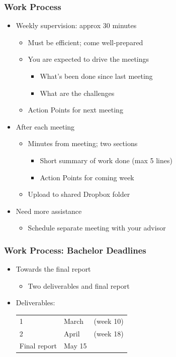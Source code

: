 \documentclass[hyperref={pdfpagelabels=false}, aspectratio=1610,handout]{beamer}
\begin{document}
\begin{frame}
\frametitle{Work Process}
\begin{block}{}
 \begin{itemize}
  \item Weekly supervision: approx 30 minutes
  \begin{itemize}
  	\item Must be efficient; come well-prepared
  	\item You are expected to drive the meetings
	\begin{itemize}
		\item What's been done since last meeting
		\item What are the challenges
	\end{itemize}
  	\item Action Points for next meeting
  \end{itemize}
  \item<2-> After each meeting
  \begin{itemize}
  	\item<2-> Minutes from meeting;  two sections
	\begin{itemize}
		\item<2-> Short summary of work done (max 5 lines)
		\item<2-> Action Points for coming week
	\end{itemize}
	\item<2-> Upload to shared Dropbox folder
  \end{itemize}
 \item<3-> Need more assistance
 \begin{itemize}
 	\item<3-> Schedule separate meeting with your advisor
 \end{itemize}
 \end{itemize}
\end{block}
\end{frame}

\begin{frame}
\frametitle{Work Process: Bachelor Deadlines}
\begin{block}{}
 \begin{itemize}
  \item Towards the final report
  \begin{itemize}
  	\item Two deliverables and final report
  \end{itemize}
  \item Deliverables:\\
  \begin{tabular}{lll}
  1 & March & (week 10) \\
  2 & April & (week 18) \\
  Final report & May 15 & \\
  \end{tabular}
 \end{itemize}
\end{block}
\end{frame}
\end{document}
